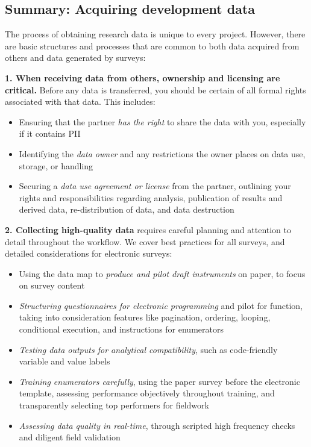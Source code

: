 \documentclass[
]{book}
\providecommand{\tightlist}{%
  \setlength{\itemsep}{0pt}\setlength{\parskip}{0pt}}
\begin{document}
\begin{summary}
\hypertarget{summary-acquiring-development-data}{%
\subsection*{Summary: Acquiring development data}\label{summary-acquiring-development-data}}

The process of obtaining research data is unique to every project. However, there are basic structures and processes that are common to both data acquired from others and data generated by surveys:

\textbf{1. When receiving data from others, ownership and licensing are critical.} Before any data is transferred, you should be certain of all formal rights associated with that data. This includes:

\begin{itemize}
\tightlist
\item
  Ensuring that the partner \emph{has the right} to share the data with you, especially if it contains PII
\item
  Identifying the \emph{data owner} and any restrictions the owner places on data use, storage, or handling
\item
  Securing a \emph{data use agreement or license} from the partner, outlining your rights and responsibilities regarding analysis, publication of results and derived data, re-distribution of data, and data destruction
\end{itemize}

\textbf{2. Collecting high-quality data} requires careful planning and attention to detail throughout the workflow. We cover best practices for all surveys, and detailed considerations for electronic surveys:

\begin{itemize}
\tightlist
\item
  Using the data map to \emph{produce and pilot draft instruments} on paper, to focus on survey content
\item
  \emph{Structuring questionnaires for electronic programming} and pilot for function, taking into consideration features like pagination, ordering, looping, conditional execution, and instructions for enumerators
\item
  \emph{Testing data outputs for analytical compatibility}, such as code-friendly variable and value labels
\item
  \emph{Training enumerators carefully}, using the paper survey before the electronic template, assessing performance objectively throughout training, and transparently selecting top performers for fieldwork
\item
  \emph{Assessing data quality in real-time}, through scripted high frequency checks and diligent field validation
\end{itemize}


\end{summary}
\end{document}
